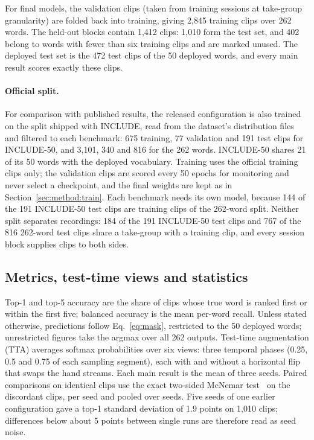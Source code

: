 \documentclass[pdflatex,sn-mathphys-num,twocolumn]{sn-jnl}
\theoremstyle{thmstyleone}%
\begin{document}
For final models, the validation clips (taken from training sessions at take-group granularity) are folded back into training, giving 2,845 training clips over 262 words. The held-out blocks contain 1,412 clips: 1,010 form the test set, and 402 belong to words with fewer than six training clips and are marked unused. The deployed test set is the 472 test clips of the 50 deployed words, and every main result scores exactly these clips.

\paragraph{Official split.} For comparison with published results, the released configuration is also trained on the split shipped with INCLUDE, read from the dataset's distribution files and filtered to each benchmark: 675 training, 77 validation and 191 test clips for INCLUDE-50, and 3,101, 340 and 816 for the 262 words. INCLUDE-50 shares 21 of its 50 words with the deployed vocabulary. Training uses the official training clips only; the validation clips are scored every 50 epochs for monitoring and never select a checkpoint, and the final weights are kept as in Section~\ref{sec:method:train}. Each benchmark needs its own model, because 144 of the 191 INCLUDE-50 test clips are training clips of the 262-word split. Neither split separates recordings: 184 of the 191 INCLUDE-50 test clips and 767 of the 816 262-word test clips share a take-group with a training clip, and every session block supplies clips to both sides.

\subsection{Metrics, test-time views and statistics}\label{sec:method:metrics}
Top-1 and top-5 accuracy are the share of clips whose true word is ranked first or within the first five; balanced accuracy is the mean per-word recall. Unless stated otherwise, predictions follow Eq.~\eqref{eq:mask}, restricted to the 50 deployed words; unrestricted figures take the argmax over all 262 outputs. Test-time augmentation (TTA) averages softmax probabilities over six views: three temporal phases (0.25, 0.5 and 0.75 of each sampling segment), each with and without a horizontal flip that swaps the hand streams. Each main result is the mean of three seeds. Paired comparisons on identical clips use the exact two-sided McNemar test~\cite{mcnemar1947} on the discordant clips, per seed and pooled over seeds. Five seeds of one earlier configuration gave a top-1 standard deviation of 1.9 points on 1,010 clips; differences below about 5 points between single runs are therefore read as seed noise.
\end{document}
